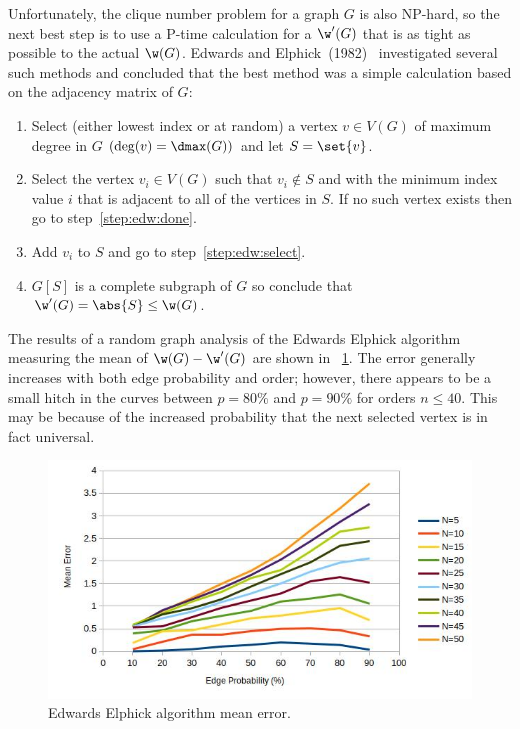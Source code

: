 Unfortunately, the clique number problem for a graph \(G\) is also NP-hard, so the next best step is to use a
P-time calculation for a \(\w'(G)\) that is as tight as possible to the actual \(\w(G)\).  Edwards and
Elphick~(1982)~\cite{edwards} investigated several such methods and concluded that the best method was a simple
calculation based on the adjacency matrix of \(G\):
\begin{enumerate}
\item Select (either lowest index or at random) a vertex \(v\in V(G)\) of maximum degree in \(G\)
  \((\deg(v)=\dmax(G))\) and let \(S=\set{v}\).
\item\label{step:edw:select} Select the vertex \(v_i\in V(G)\) such that \(v_i\notin S\) and with the minimum index
  value \(i\) that is adjacent to all of the vertices in \(S\).  If no such vertex exists then go to
  step~\ref{step:edw:done}.
\item Add \(v_i\) to \(S\) and go to step~\ref{step:edw:select}.
\item\label{step:edw:done} \(G[S]\) is a complete subgraph of \(G\) so conclude that \(\w'(G)=\abs{S}\le\w(G)\).
\end{enumerate}

The results of a random graph analysis of the Edwards Elphick algorithm measuring the mean of \(\w(G)-\w'(G)\) are
shown in \figurename~\ref{fig:edwards1:error}.  The error generally increases with both edge probability and order;
however, there appears to be a small hitch in the curves between \(p=80\%\) and \(p=90\%\) for orders \(n\le40\).
This may be because of the increased probability that the next selected vertex is in fact universal.

\begin{figure}[H]
  \centering
  \includegraphics[width=5in]{edwards1_error}
  \caption{Edwards Elphick algorithm mean error.}
  \label{fig:edwards1:error}
\end{figure}

